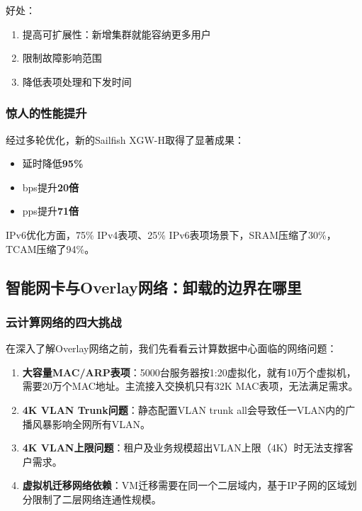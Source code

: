 好处：
\begin{enumerate}
    \item 提高可扩展性：新增集群就能容纳更多用户
    \item 限制故障影响范围
    \item 降低表项处理和下发时间
\end{enumerate}

\subsubsection{惊人的性能提升}

经过多轮优化，新的Sailfish XGW-H取得了显著成果：
\begin{itemize}
    \item 延时降低\textbf{95\%}
    \item bps提升\textbf{20倍}
    \item pps提升\textbf{71倍}
\end{itemize}

IPv6优化方面，75\% IPv4表项、25\% IPv6表项场景下，SRAM压缩了30\%，TCAM压缩了94\%。

\subsection{智能网卡与Overlay网络：卸载的边界在哪里}

\subsubsection{云计算网络的四大挑战}

在深入了解Overlay网络之前，我们先看看云计算数据中心面临的网络问题：

\begin{enumerate}
    \item \textbf{大容量MAC/ARP表项}：5000台服务器按1:20虚拟化，就有10万个虚拟机，需要20万个MAC地址。主流接入交换机只有32K MAC表项，无法满足需求。
    
    \item \textbf{4K VLAN Trunk问题}：静态配置VLAN trunk all会导致任一VLAN内的广播风暴影响全网所有VLAN。
    
    \item \textbf{4K VLAN上限问题}：租户及业务规模超出VLAN上限（4K）时无法支撑客户需求。
    
    \item \textbf{虚拟机迁移网络依赖}：VM迁移需要在同一个二层域内，基于IP子网的区域划分限制了二层网络连通性规模。
\end{enumerate}

